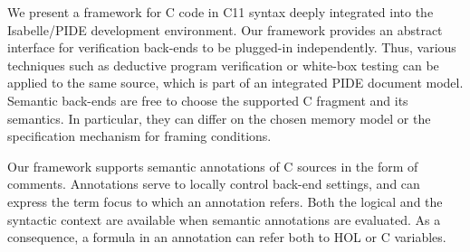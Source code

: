 %
\begin{isabellebody}%
%
%
\isadelimtheory
%
\endisadelimtheory
%
\isatagtheory
%
\endisatagtheory
{\isafoldtheory}%
%
\isadelimtheory
%
\endisadelimtheory
%
\isadelimML
%
\endisadelimML
%
\isatagML
%
\endisatagML
{\isafoldML}%
%
\isadelimML
%
\endisadelimML
%
\begin{isamarkuptext*}%
[label = {abs},type = {scholarly_paper.abstract}, args={label = {abs},type = {scholarly_paper.abstract}, scholarly_paper.abstract.keywordlist = {{User Interface, Integrated Development, Program Verification, Shallow Embedding}}}]We present a framework for C code in C11 syntax deeply integrated into the Isabelle/PIDE
  development environment. Our framework provides an abstract interface for verification back-ends
  to be plugged-in independently. Thus, various techniques such as deductive program verification or
  white-box testing can be applied to the same source, which is part of an integrated PIDE document
  model. Semantic back-ends are free to choose the supported C fragment and its semantics. In
  particular, they can differ on the chosen memory model or the specification mechanism
  for framing conditions.

  Our framework supports semantic annotations of C sources in the form of comments. Annotations
  serve to locally control back-end settings, and can express the term focus to which
  an annotation refers. Both the logical and the syntactic context are available when semantic
  annotations are evaluated. As a consequence, a formula in an annotation can refer both 
  to  HOL or C variables.


\end{isamarkuptext*}
\end{isabellebody}
